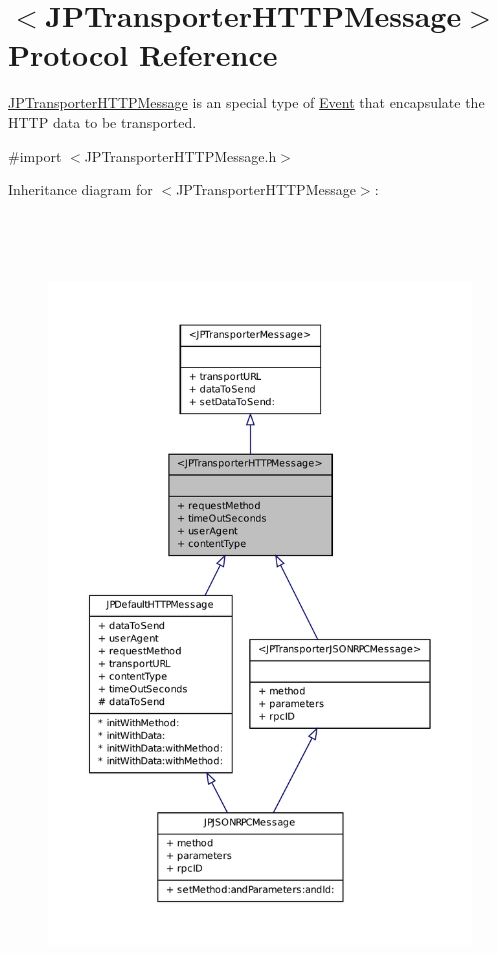 \hypertarget{a00040}{
\section{$<$JPTransporterHTTPMessage$>$ Protocol Reference}
\label{a00040}
}


\hyperlink{a00040}{JPTransporterHTTPMessage} is an special type of \hyperlink{a00005}{Event} that encapsulate the HTTP data to be transported.  




{\ttfamily \#import $<$JPTransporterHTTPMessage.h$>$}



Inheritance diagram for $<$JPTransporterHTTPMessage$>$:
\nopagebreak
\begin{figure}[H]
\begin{center}
\leavevmode
\includegraphics[height=600pt]{a00167}
\end{center}
\end{figure}


